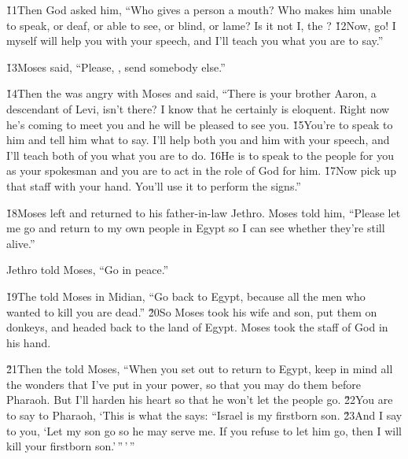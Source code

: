 \v{11}Then God asked him, ``Who gives a person a mouth? Who makes him unable to speak, or deaf, or able to see, or blind, or lame? Is it not I, the ? \v{12}Now, go! I myself will help you with your speech, and I'll teach you what you are to say.''

\v{13}Moses said, ``Please, , send somebody else.''

\v{14}Then the  was angry with Moses and said, ``There is your brother Aaron, a descendant of Levi, isn't there? I know that he certainly is eloquent. Right now he's coming to meet you and he will be pleased to see you. \v{15}You're to speak to him and tell him what to say. I'll help both you and him with your speech, and I'll teach both of you what you are to do. \v{16}He is to speak to the people for you as your spokesman and you are to act in the role of God for him. \v{17}Now pick up that staff with your hand. You'll use it to perform the signs.''

\v{18}Moses left and returned to his father-in-law Jethro. Moses told him, ``Please let me go and return to my own people in Egypt so I can see whether they're still alive.''

Jethro told Moses, ``Go in peace.''

\v{19}The  told Moses in Midian, ``Go back to Egypt, because all the men who wanted to kill you are dead.'' \v{20}So Moses took his wife and son, put them on donkeys, and headed back to the land of Egypt. Moses took the staff of God in his hand.

\v{21}Then the  told Moses, ``When you set out to return to Egypt, keep in mind all the wonders that I've put in your power, so that you may do them before Pharaoh. But I'll harden his heart so that he won't let the people go. \v{22}You are to say to Pharaoh, `This is what the  says: ``Israel is my firstborn son. \v{23}And I say to you, `Let my son go so he may serve me. If you refuse to let him go, then I will kill your firstborn son.'\,''\,'\,''

